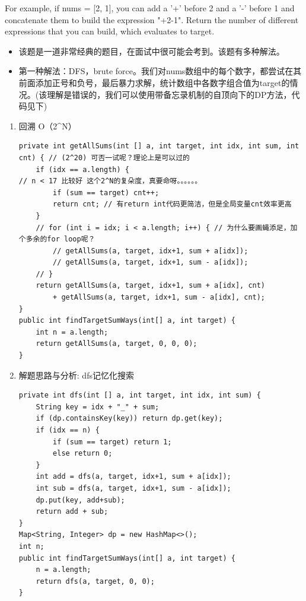 \documentclass[9pt, b5paaper]{book}
\begin{document}
For example, if nums = [2, 1], you can add a '+' before 2 and a '-' before 1 and concatenate them to build the expression "+2-1".
Return the number of different expressions that you can build, which evaluates to target.
\begin{itemize}
\item 该题是一道非常经典的题目，在面试中很可能会考到。该题有多种解法。
\item 第一种解法：DFS，brute force。我们对nums数组中的每个数字，都尝试在其前面添加正号和负号，最后暴力求解，统计数组中各数字组合值为target的情况。(该理解是错误的，我们可以使用带备忘录机制的自顶向下的DP方法，代码见下)
\end{itemize}
\begin{enumerate}
\item 回溯 O（2\^{}N）
\label{sec-1-1-6-1}
\begin{verbatim}
private int getAllSums(int [] a, int target, int idx, int sum, int cnt) { // (2^20) 可否一试呢？理论上是可以过的
    if (idx == a.length) {                                                // n < 17 比较好 这个2^N的复朵度，真要命呀。。。。。。
        if (sum == target) cnt++;
        return cnt; // 有return int代码更简洁，但是全局变量cnt效率更高
    }
    // for (int i = idx; i < a.length; i++) { // 为什么要画蝇添足，加个多余的for loop呢？ 
        // getAllSums(a, target, idx+1, sum + a[idx]);
        // getAllSums(a, target, idx+1, sum - a[idx]);
    // }
    return getAllSums(a, target, idx+1, sum + a[idx], cnt)
        + getAllSums(a, target, idx+1, sum - a[idx], cnt);
}
public int findTargetSumWays(int[] a, int target) { 
    int n = a.length;
    return getAllSums(a, target, 0, 0, 0);
}
\end{verbatim}
\item 解题思路与分析: dfs记忆化搜索
\label{sec-1-1-6-2}
\begin{verbatim}
private int dfs(int [] a, int target, int idx, int sum) {
    String key = idx + "_" + sum;
    if (dp.containsKey(key)) return dp.get(key);
    if (idx == n) {
        if (sum == target) return 1;
        else return 0;
    }
    int add = dfs(a, target, idx+1, sum + a[idx]);
    int sub = dfs(a, target, idx+1, sum - a[idx]);
    dp.put(key, add+sub);
    return add + sub;
}
Map<String, Integer> dp = new HashMap<>();
int n;
public int findTargetSumWays(int[] a, int target) {
    n = a.length;
    return dfs(a, target, 0, 0);
}
\end{verbatim}
\begin{itemize}

\end{itemize}
\end{enumerate}
\end{document}
